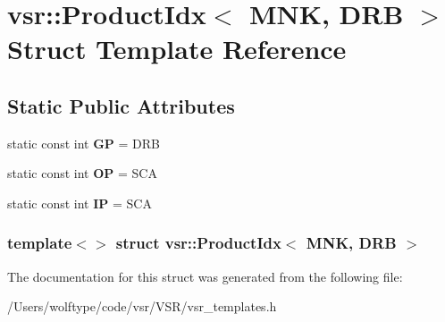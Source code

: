 \hypertarget{structvsr_1_1_product_idx_3_01_m_n_k_00_01_d_r_b_01_4}{\section{vsr\-:\-:Product\-Idx$<$ M\-N\-K, D\-R\-B $>$ Struct Template Reference}
\label{structvsr_1_1_product_idx_3_01_m_n_k_00_01_d_r_b_01_4}
}
\subsection*{Static Public Attributes}
\begin{DoxyCompactItemize}
\item 
\hypertarget{structvsr_1_1_product_idx_3_01_m_n_k_00_01_d_r_b_01_4_a90fea8e53bf4c7887f3fa021c910734b}{static const int {\bfseries G\-P} = D\-R\-B}\label{structvsr_1_1_product_idx_3_01_m_n_k_00_01_d_r_b_01_4_a90fea8e53bf4c7887f3fa021c910734b}

\item 
\hypertarget{structvsr_1_1_product_idx_3_01_m_n_k_00_01_d_r_b_01_4_af90aa15bb8199ba5af57762f4f3a1248}{static const int {\bfseries O\-P} = S\-C\-A}\label{structvsr_1_1_product_idx_3_01_m_n_k_00_01_d_r_b_01_4_af90aa15bb8199ba5af57762f4f3a1248}

\item 
\hypertarget{structvsr_1_1_product_idx_3_01_m_n_k_00_01_d_r_b_01_4_a15ed8b3084b1b0637ec69f409d840486}{static const int {\bfseries I\-P} = S\-C\-A}\label{structvsr_1_1_product_idx_3_01_m_n_k_00_01_d_r_b_01_4_a15ed8b3084b1b0637ec69f409d840486}

\end{DoxyCompactItemize}
\subsubsection*{template$<$$>$ struct vsr\-::\-Product\-Idx$<$ M\-N\-K, D\-R\-B $>$}



The documentation for this struct was generated from the following file\-:\begin{DoxyCompactItemize}
\item 
/\-Users/wolftype/code/vsr/\-V\-S\-R/vsr\-\_\-templates.\-h\end{DoxyCompactItemize}
